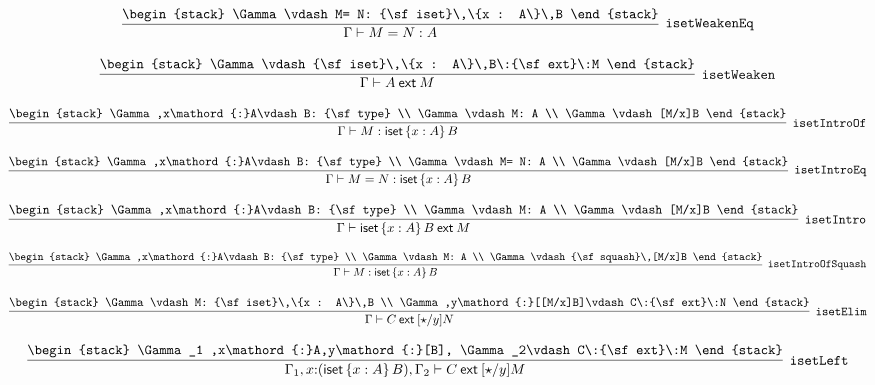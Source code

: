 \[
\infer[{\tt isetWeakenEq}]{\Gamma \vdash M= N: A}{
\begin{stack}
\Gamma \vdash M= N: {\sf iset}\,\{x : A\}\,B
\end{stack}}
\]

\[
\infer[{\tt isetWeaken}]{\Gamma \vdash A\:{\sf ext}\:M}{
\begin{stack}
\Gamma \vdash {\sf iset}\,\{x : A\}\,B\:{\sf ext}\:M
\end{stack}}
\]

\[
\infer[{\tt isetIntroOf}]{\Gamma \vdash M: {\sf iset}\,\{x : A\}\,B}{
\begin{stack}
\Gamma ,x\mathord{:}A\vdash B: {\sf type}
\\
\Gamma \vdash M: A
\\
\Gamma \vdash [M/x]B
\end{stack}}
\]

\[
\infer[{\tt isetIntroEq}]{\Gamma \vdash M= N: {\sf iset}\,\{x : A\}\,B}{
\begin{stack}
\Gamma ,x\mathord{:}A\vdash B: {\sf type}
\\
\Gamma \vdash M= N: A
\\
\Gamma \vdash [M/x]B
\end{stack}}
\]

\[
\infer[{\tt isetIntro}]{\Gamma \vdash {\sf iset}\,\{x : A\}\,B\:{\sf ext}\:M}{
\begin{stack}
\Gamma ,x\mathord{:}A\vdash B: {\sf type}
\\
\Gamma \vdash M: A
\\
\Gamma \vdash [M/x]B
\end{stack}}
\]

\[
\infer[{\tt isetIntroOfSquash}]{\Gamma \vdash M: {\sf iset}\,\{x : A\}\,B}{
\begin{stack}
\Gamma ,x\mathord{:}A\vdash B: {\sf type}
\\
\Gamma \vdash M: A
\\
\Gamma \vdash {\sf squash}\,[M/x]B
\end{stack}}
\]

\[
\infer[{\tt isetElim}]{\Gamma \vdash C\:{\sf ext}\:[\star /y]N}{
\begin{stack}
\Gamma \vdash M: {\sf iset}\,\{x : A\}\,B
\\
\Gamma ,y\mathord{:}[[M/x]B]\vdash C\:{\sf ext}\:N
\end{stack}}
\]

\[
\infer[{\tt isetLeft}]{\Gamma_1 ,x\mathord{:}({\sf iset}\,\{x : A\}\,B), \Gamma_2 \vdash C\:{\sf ext}\:[\star /y]M}{
\begin{stack}
\Gamma_1 ,x\mathord{:}A,y\mathord{:}[B], \Gamma_2\vdash C\:{\sf ext}\:M
\end{stack}}
\]

